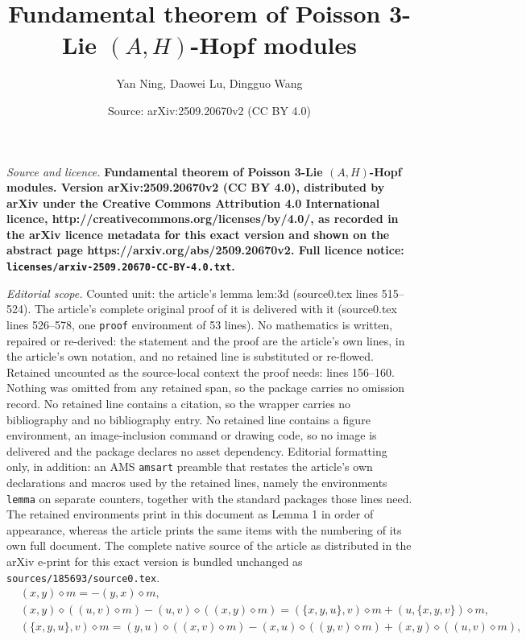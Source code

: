 \documentclass[10pt,a4paper]{amsart}
\title{\bf Fundamental theorem of Poisson 3-Lie $(A,H)$-Hopf modules}
\author{Yan Ning, Daowei Lu, Dingguo Wang}
\date{Source: arXiv:2509.20670v2 (CC BY 4.0)}
\def\di{\diamond}
\begin{document}
\maketitle

\noindent\emph{Source and licence.} \bf Fundamental theorem of Poisson 3-Lie $(A,H)$-Hopf modules. Version arXiv:2509.20670v2 (CC BY 4.0), distributed by arXiv under the Creative Commons Attribution 4.0 International licence, http://creativecommons.org/licenses/by/4.0/, as recorded in the arXiv licence metadata for this exact version and shown on the abstract page https://arxiv.org/abs/2509.20670v2. Full licence notice: \texttt{licenses/arxiv-2509.20670-CC-BY-4.0.txt}.\par\smallskip

\noindent\textit{Editorial scope.} Counted unit: the article's lemma lem:3d (source0.tex lines 515--524). The article's complete original proof of it is delivered with it (source0.tex lines 526--578, one \texttt{proof} environment of 53 lines). No mathematics is written, repaired or re-derived: the statement and the proof are the article's own lines, in the article's own notation, and no retained line is substituted or re-flowed.  Retained uncounted as the source-local context the proof needs: lines 156--160.  Nothing was omitted from any retained span, so the package carries no omission record.  No retained line contains a citation, so the wrapper carries no bibliography and no bibliography entry.  No retained line contains a figure environment, an image-inclusion command or drawing code, so no image is delivered and the package declares no asset dependency.  Editorial formatting only, in addition: an AMS \texttt{amsart} preamble that restates the article's own declarations and macros used by the retained lines, namely the environments \texttt{lemma} on separate counters, together with the standard packages those lines need.  The retained environments print in this document as Lemma 1 in order of appearance, whereas the article prints the same items with the numbering of its own full document.  The complete native source of the article as distributed in the arXiv e-print for this exact version is bundled unchanged as \texttt{sources/185693/source0.tex}.
\begin{align}
&(x, y)\di m=-(y, x)\di m,\label{1b}\\
&(x, y)\di((u,v)\di m)-(u,v)\di((x, y)\di m)=(\{x,y,u\},v)\di m+(u,\{x,y,v\})\di m,\label{1c}\\
&(\{x,y,u\},v)\di m=(y,u)\di((x,v)\di m)-(x,u)\di((y,v)\di m)+(x,y)\di((u,v)\di m),\label{1d}
\end{align}
\end{document}
